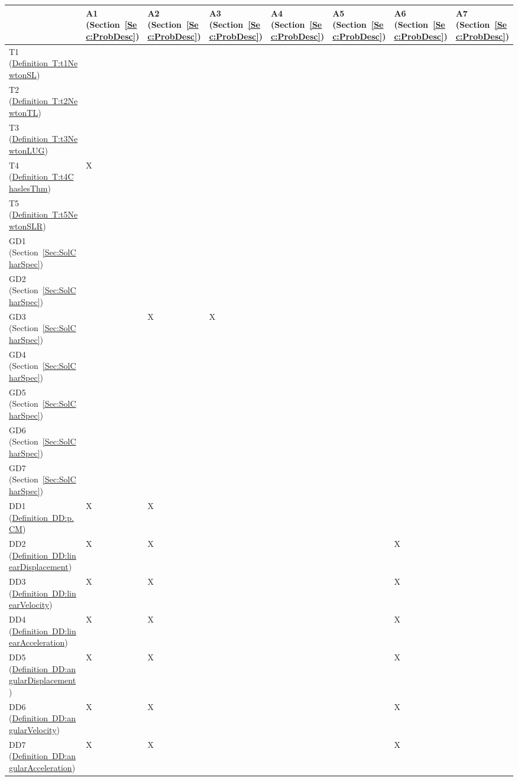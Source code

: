 \documentclass[12pt]{article}
\begin{document}
\begin{longtable}{l l l l l l l l}
\toprule
 & A1 (Section~\ref{Sec:ProbDesc}) & A2 (Section~\ref{Sec:ProbDesc}) & A3 (Section~\ref{Sec:ProbDesc}) & A4 (Section~\ref{Sec:ProbDesc}) & A5 (Section~\ref{Sec:ProbDesc}) & A6 (Section~\ref{Sec:ProbDesc}) & A7 (Section~\ref{Sec:ProbDesc})
\\
\midrule
T1 (\hyperref[T:t1NewtonSL]{Definition~T:t1NewtonSL}) &  &  &  &  &  &  & 
\\
T2 (\hyperref[T:t2NewtonTL]{Definition~T:t2NewtonTL}) &  &  &  &  &  &  & 
\\
T3 (\hyperref[T:t3NewtonLUG]{Definition~T:t3NewtonLUG}) &  &  &  &  &  &  & 
\\
T4 (\hyperref[T:t4ChaslesThm]{Definition~T:t4ChaslesThm}) & X &  &  &  &  &  & 
\\
T5 (\hyperref[T:t5NewtonSLR]{Definition~T:t5NewtonSLR}) &  &  &  &  &  &  & 
\\
GD1 (Section~\ref{Sec:SolCharSpec}) &  &  &  &  &  &  & 
\\
GD2 (Section~\ref{Sec:SolCharSpec}) &  &  &  &  &  &  & 
\\
GD3 (Section~\ref{Sec:SolCharSpec}) &  & X & X &  &  &  & 
\\
GD4 (Section~\ref{Sec:SolCharSpec}) &  &  &  &  &  &  & 
\\
GD5 (Section~\ref{Sec:SolCharSpec}) &  &  &  &  &  &  & 
\\
GD6 (Section~\ref{Sec:SolCharSpec}) &  &  &  &  &  &  & 
\\
GD7 (Section~\ref{Sec:SolCharSpec}) &  &  &  &  &  &  & 
\\
DD1 (\hyperref[DD:p.CM]{Definition~DD:p.CM}) & X & X &  &  &  &  & 
\\
DD2 (\hyperref[DD:linearDisplacement]{Definition~DD:linearDisplacement}) & X & X &  &  &  & X & 
\\
DD3 (\hyperref[DD:linearVelocity]{Definition~DD:linearVelocity}) & X & X &  &  &  & X & 
\\
DD4 (\hyperref[DD:linearAcceleration]{Definition~DD:linearAcceleration}) & X & X &  &  &  & X & 
\\
DD5 (\hyperref[DD:angularDisplacement]{Definition~DD:angularDisplacement}) & X & X &  &  &  & X & 
\\
DD6 (\hyperref[DD:angularVelocity]{Definition~DD:angularVelocity}) & X & X &  &  &  & X & 
\\
DD7 (\hyperref[DD:angularAcceleration]{Definition~DD:angularAcceleration}) & X & X &  &  &  & X & 
\\

\end{longtable}
\end{document}
